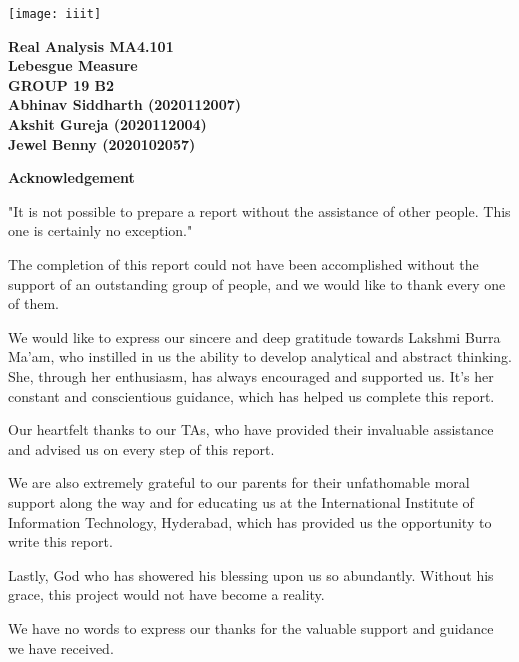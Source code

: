 \documentclass{article}
\begin{document}
\begin{titlepage}

\centering
\vfill
\texttt{[image: iiit]}
\vskip2cm

{\bfseries\Large
        Real Analysis MA4.101\\
        \vskip2cm
        Lebesgue Measure\\
        \vskip3cm
       GROUP 19 B2}\\
        \vskip 1cm
{\bfseries        Abhinav Siddharth (2020112007)\\
        \vskip 0.5cm
        Akshit Gureja (2020112004)\\
        \vskip 0.5cm
        Jewel Benny (2020102057)}
    


\end{titlepage}



\newpage
\begin{center}
    {\Large\bfseries\noindent Acknowledgement}
\end{center}

\hfill

"It is not possible to prepare a report without the assistance of other people. This one is certainly no exception."\bigskip

The completion of this report could not have been accomplished without the support of an outstanding group of people, and we would like to thank every one of them.\bigskip

We would like to express our sincere and deep gratitude towards Lakshmi Burra Ma'am, who instilled in us the ability to develop analytical and abstract thinking. She, through her enthusiasm, has always encouraged and supported us. It's her constant and conscientious guidance, which has helped us complete this report.\bigskip

Our heartfelt thanks to our TAs, who have provided their invaluable assistance and advised us on every step of this report. \bigskip

We are also extremely grateful to our parents for their unfathomable moral support along the way and for educating us at the International Institute of Information Technology, Hyderabad, which has provided us the opportunity to write this report.
\bigskip

Lastly, God who has showered his blessing upon us so abundantly. Without his grace, this project would not have become a reality.
\bigskip

We have no words to express our thanks for the valuable support and guidance we have received.
\end{document}
